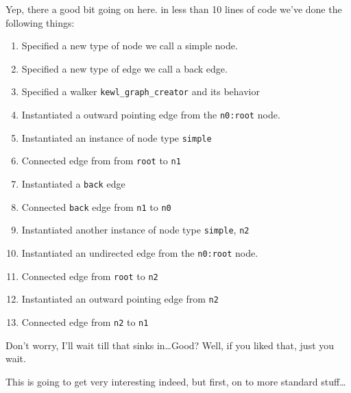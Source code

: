 Yep, there a good bit going on here. in less than 10 lines of code we've done the following things:
\begin{enumerate}[itemsep=0mm]
    \footnotesize
    \item Specified a new type of node we call a simple node.
    \item Specified a new type of edge we call a back edge.
    \item Specified a walker \texttt{kewl\_graph\_creator} and its behavior
    \item Instantiated a outward pointing edge from the \texttt{n0:root} node.
    \item Instantiated an instance of node type \texttt{simple}
    \item Connected edge from from \texttt{root} to \texttt{n1}
    \item Instantiated a \texttt{back} edge
    \item Connected \texttt{back} edge from \texttt{n1} to \texttt{n0}
    \item Instantiated another instance of node type \texttt{simple}, \texttt{n2}
    \item Instantiated an undirected edge from the \texttt{n0:root} node.
    \item Connected edge from \texttt{root} to \texttt{n2}
    \item Instantiated an outward pointing edge from \texttt{n2}
    \item Connected edge from \texttt{n2} to \texttt{n1}
\end{enumerate}

Don't worry, I'll wait till that sinks in\dots Good? Well, if you liked that, just you wait.
\par
This is going to get very interesting indeed, but first,  on to more standard stuff\dots
